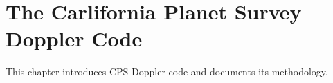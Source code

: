 \chapter{The Carlifornia Planet Survey Doppler Code}

This chapter introduces CPS Doppler code and documents its methodology.
